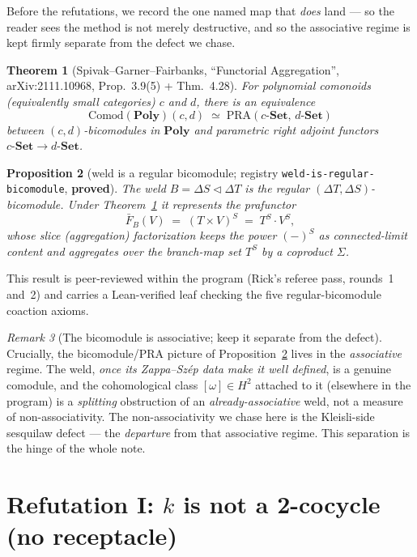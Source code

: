 \documentclass[11pt]{amsart}
\theoremstyle{plain}
\newtheorem{theorem}{Theorem}[section]
\newtheorem{proposition}[theorem]{Proposition}
\theoremstyle{definition}
\theoremstyle{remark}
\newtheorem{remark}[theorem]{Remark}
\newcommand{\Poly}{\mathbf{Poly}}
\newcommand{\Set}{\mathbf{Set}}
\newcommand{\Comod}{\mathrm{Comod}}
\newcommand{\PRA}{\mathrm{PRA}}
\renewcommand{\lhd}{\triangleleft}
\newcommand{\Store}[1]{\Delta #1}
\begin{document}
Before the refutations, we record the one named map that \emph{does} land --- so the reader sees the
method is not merely destructive, and so the associative regime is kept firmly separate from the
defect we chase.

\begin{theorem}[Spivak--Garner--Fairbanks, ``Functorial Aggregation'', arXiv:2111.10968,
Prop.~3.9(5) + Thm.~4.28]
\label{thm:sgf}
For polynomial comonoids (equivalently small categories) $c$ and $d$, there is an equivalence
\[
  \Comod(\Poly)(c,d) \;\simeq\; \PRA(c\text{-}\Set,\,d\text{-}\Set)
\]
between $(c,d)$-bicomodules in $\Poly$ and parametric right adjoint functors
$c\text{-}\Set\to d\text{-}\Set$.
\end{theorem}

\begin{proposition}[weld is a regular bicomodule; registry \texttt{weld-is-regular-bicomodule}, \textbf{proved}]
\label{prop:weld-bicomodule}
The weld $B=\Store{S}\lhd\Store{T}$ is the \emph{regular} $(\Store{T},\Store{S})$-bicomodule. Under
Theorem~\ref{thm:sgf} it represents the prafunctor
\[
  \bar F_B(V)\;=\;(T\times V)^{S}\;=\;T^{S}\cdot V^{S},
\]
whose slice (aggregation) factorization keeps the power $(-)^{S}$ as connected-limit content and
aggregates over the branch-map set $T^{S}$ by a coproduct $\Sigma$.
\end{proposition}

This result is peer-reviewed within the program (Rick's referee pass, rounds~1 and~2) and carries a
Lean-verified leaf checking the five regular-bicomodule coaction axioms.

\begin{remark}[The bicomodule is associative; keep it separate from the defect]
\label{rem:separate}
Crucially, the bicomodule/PRA picture of Proposition~\ref{prop:weld-bicomodule} lives in the
\emph{associative} regime. The weld, \emph{once its Zappa--Sz\'ep data make it well defined}, is a
genuine comodule, and the cohomological class $[\omega]\in H^{2}$ attached to it (elsewhere in the
program) is a \emph{splitting} obstruction of an \emph{already-associative} weld, not a measure of
non-associativity. The non-associativity we chase here is the Kleisli-side sesquilaw defect --- the
\emph{departure} from that associative regime. This separation is the hinge of the whole note.
\end{remark}

\section{Refutation I: \texorpdfstring{$k$}{k} is not a 2-cocycle (no receptacle)}
\label{sec:cocycle}
\end{document}
